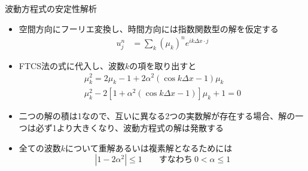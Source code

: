 \begin{frame}[t]{波動方程式の安定性解析}
  \begin{itemize}
  \item 空間方向にフーリエ変換し、時間方向には指数関数型の解を仮定する
    \begin{align*}
    u_j^n &= \sum_k (\mu_k)^n e^{ik\Delta x \cdot j}
    \end{align*}
  \item FTCS法の式に代入し、波数$k$の項を取り出すと
    \begin{align*}
    \mu_k^2 =  2\mu_k - 1 + 2\alpha^2(\cos k \Delta x - 1) \mu_k \\
    \mu_k^2 - 2 [1 + \alpha^2(\cos k \Delta x - 1)] \mu_k + 1 = 0
    \end{align*}
  \item 二つの解の積は1なので、互いに異なる2つの実数解が存在する場合、解の一つは必ず1より大きくなり、波動方程式の解は発散する
  \item 全ての波数\(k\)について重解あるいは複素解となるためには
    \[
      | 1 - 2 \alpha^2 | \le 1 \qquad \text{すなわち} \ 0 < \alpha \le 1
    \]
  \end{itemize}
\end{frame}
